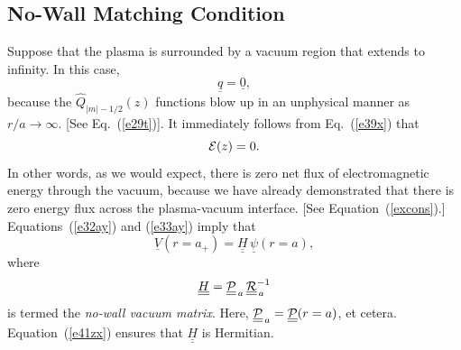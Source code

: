 \documentclass[12pt,prb,aps]{revtex4-1}
\begin{document}
\subsection{No-Wall Matching Condition}
Suppose that the plasma is surrounded by a vacuum region that extends to infinity. In this case, 
\begin{equation}
\underline{q}=\underline{0},
\end{equation}
 because the 
$\hat{Q}_{|m|-1/2}(z)$ functions blow up in an unphysical manner as $r/a\rightarrow\infty$. [See Eq.~(\ref{e29t})].
It immediately follows from Eq.~(\ref{e39x}) that
 \begin{equation}\label{ezero}
 {\cal E}(z)=0.
 \end{equation}
  In other words, as we would expect, there is zero net flux of electromagnetic energy through the vacuum, because we have already demonstrated that there is zero
  energy flux across the plasma-vacuum interface. [See Equation~(\ref{excons}).]  
Equations~(\ref{e32ay}) and (\ref{e33ay}) imply that
\begin{equation}\label{hdef}
 \underline{V}(r=a_+)= \underline{\underline{H}}\,\underline{\psi}(r=a),
 \end{equation}
 where
 \begin{equation}
 \underline{\underline{H}}= \underline{\underline{\cal P}}_{\,a}\,\underline{\underline{\cal R}}_{\,a}^{-1}
 \end{equation}
 is termed the {\em no-wall vacuum matrix}. 
   Here, $\underline{\underline{\cal P}}_{\,a}= \underline{\underline{\cal P}}(r=a)$, et cetera. 
Equation~(\ref{e41zx}) ensures that  $\underline{\underline{H}}$ is Hermitian. 
\end{document}
